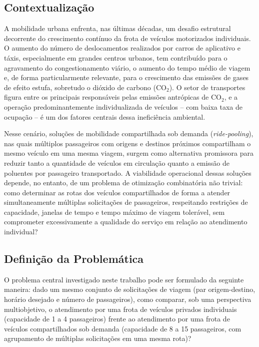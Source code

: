 \documentclass[12pt,a4paper]{article}
\theoremstyle{plain}
\begin{document}
\subsection{Contextualização}

A mobilidade urbana enfrenta, nas últimas décadas, um desafio estrutural decorrente do crescimento contínuo da frota de veículos motorizados individuais. O aumento do número de deslocamentos realizados por carros de aplicativo e táxis, especialmente em grandes centros urbanos, tem contribuído para o agravamento do congestionamento viário, o aumento do tempo médio de viagem e, de forma particularmente relevante, para o crescimento das emissões de gases de efeito estufa, sobretudo o dióxido de carbono ($\text{CO}_2$). O setor de transportes figura entre os principais responsáveis pelas emissões antrópicas de $\text{CO}_2$, e a operação predominantemente individualizada de veículos -- com baixa taxa de ocupação -- é um dos fatores centrais dessa ineficiência ambiental.

Nesse cenário, soluções de mobilidade compartilhada sob demanda (\textit{ride-pooling}), nas quais múltiplos passageiros com origens e destinos próximos compartilham o mesmo veículo em uma mesma viagem, surgem como alternativa promissora para reduzir tanto a quantidade de veículos em circulação quanto a emissão de poluentes por passageiro transportado. A viabilidade operacional dessas soluções depende, no entanto, de um problema de otimização combinatória não trivial: como determinar as rotas dos veículos compartilhados de forma a atender simultaneamente múltiplas solicitações de passageiros, respeitando restrições de capacidade, janelas de tempo e tempo máximo de viagem tolerável, sem comprometer excessivamente a qualidade do serviço em relação ao atendimento individual?

\subsection{Definição da Problemática}

O problema central investigado neste trabalho pode ser formulado da seguinte maneira: dado um mesmo conjunto de solicitações de viagem (par origem-destino, horário desejado e número de passageiros), como comparar, sob uma perspectiva multiobjetivo, o atendimento por uma frota de veículos privados individuais (capacidade de 1 a 4 passageiros) frente ao atendimento por uma frota de veículos compartilhados sob demanda (capacidade de 8 a 15 passageiros, com agrupamento de múltiplas solicitações em uma mesma rota)?
\end{document}
